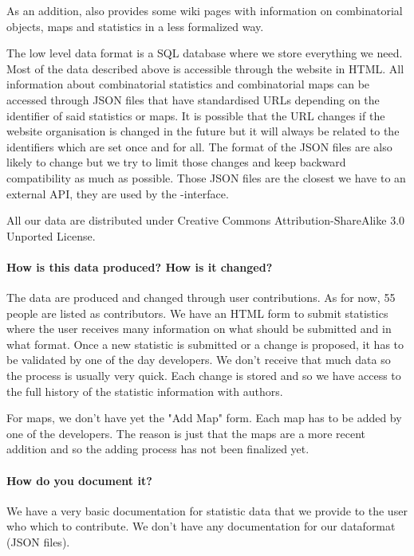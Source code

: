 As an addition, \FindStat also provides some wiki pages with information on combinatorial objects, maps and statistics in a less formalized way.

The low level data format is a SQL database where we store everything we need. Most of the data described above is accessible through the website in HTML. All information about combinatorial statistics and combinatorial maps can be accessed through JSON files that have standardised URLs depending on the identifier of said statistics or maps. It is possible that the URL changes if the website organisation is changed in the future but it will always be related to the identifiers which are set once and for all. The format of the JSON files are also likely to change but we try to limit those changes and keep backward compatibility as much as possible. Those JSON files are the closest we have to an external API, they are used by the \SageMath-\FindStat interface.

All our data are distributed under Creative Commons Attribution-ShareAlike 3.0 Unported License.

\paragraph{How is this data produced?  How is it changed?}

The data are produced and changed through user contributions. As for now, 55 people are listed as contributors. We have an HTML form to submit statistics where the user receives many information on what should be submitted and in what format. Once a new statistic is submitted or a change is proposed, it has to be validated by one of the day developers. We don't receive that much data so the process is usually very quick. Each change is stored and so we have access to the full history of the statistic information with authors.

For maps, we don't have yet the "Add Map" form. Each map has to be added by one of the \FindStat developers. The reason is just that the maps are a more recent addition and so the adding process has not been finalized yet.

\paragraph{How do you document it?}

We have a very basic documentation for statistic data that we provide to the user who which to contribute. We don't have any documentation for our dataformat (JSON files).

